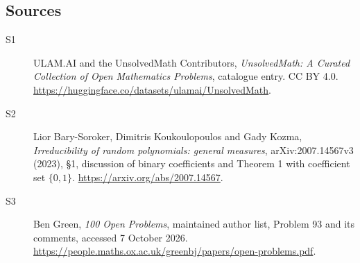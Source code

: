 \documentclass[11pt]{article}
\begin{document}
\subsection{Sources}
\begin{description}
\item[\hypertarget{source:statement:1}{S1}] ULAM.AI and the UnsolvedMath Contributors, \emph{UnsolvedMath: A Curated Collection of Open Mathematics Problems}, catalogue entry. CC BY 4.0. \url{https://huggingface.co/datasets/ulamai/UnsolvedMath}.
\item[\hypertarget{source:statement:2}{S2}] Lior Bary-Soroker, Dimitris Koukoulopoulos and Gady Kozma, \emph{Irreducibility of random polynomials: general measures}, arXiv:2007.14567v3 (2023), §1, discussion of binary coefficients and Theorem 1 with coefficient set $\{0,1\}$. \url{https://arxiv.org/abs/2007.14567}.
\item[\hypertarget{source:statement:3}{S3}] Ben Green, \emph{100 Open Problems}, maintained author list, Problem 93 and its comments, accessed 7 October 2026. \url{https://people.maths.ox.ac.uk/greenbj/papers/open-problems.pdf}.
\end{description}
\label{end:statement}
\end{document}
